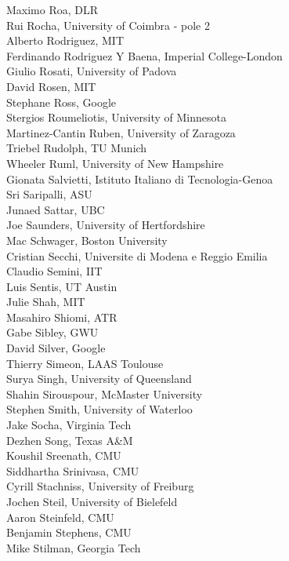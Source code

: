 \begin{multicols}{3}
{Maximo Roa, DLR\\
Rui Rocha, University of Coimbra - pole 2\\
Alberto Rodriguez, MIT\\
Ferdinando Rodriguez Y Baena, Imperial College-London\\
Giulio Rosati, University of Padova\\
David Rosen, MIT\\
Stephane Ross, Google\\
Stergios Roumeliotis, University of Minnesota\\
Martinez-Cantin Ruben, University of Zaragoza\\
Triebel Rudolph, TU Munich\\
Wheeler Ruml, University of New Hampshire\\
Gionata Salvietti, Istituto Italiano di Tecnologia-Genoa\\
Sri Saripalli, ASU\\
Junaed Sattar, UBC\\
Joe Saunders, University of Hertfordshire\\
Mac Schwager, Boston University\\
Cristian Secchi, Universite di Modena e Reggio Emilia\\
Claudio Semini, IIT\\
Luis Sentis, UT Austin\\
Julie Shah, MIT\\
Masahiro Shiomi, ATR\\
Gabe Sibley, GWU\\
David Silver, Google\\
Thierry Simeon, LAAS Toulouse\\
Surya Singh, University of Queensland\\
Shahin Sirouspour, McMaster University\\
Stephen Smith, University of Waterloo\\
Jake Socha, Virginia Tech\\
Dezhen Song, Texas A\&M\\
Koushil Sreenath, CMU\\
Siddhartha Srinivasa, CMU\\
Cyrill Stachniss, University of Freiburg\\
Jochen Steil, University of Bielefeld\\
Aaron Steinfeld, CMU\\
Benjamin Stephens, CMU\\
Mike Stilman, Georgia Tech\\
}
\end{multicols}
